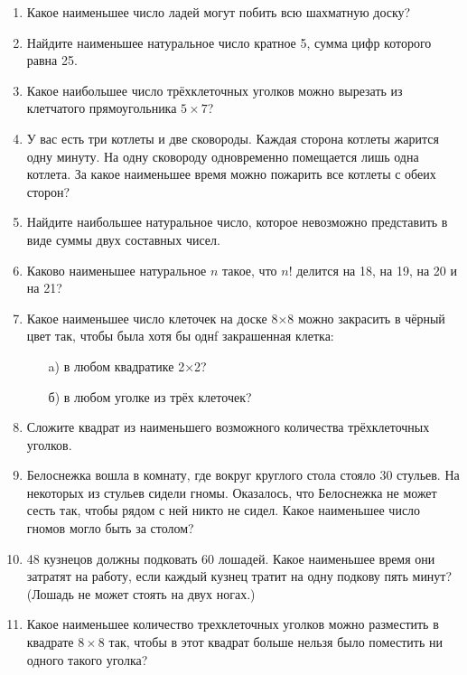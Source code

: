 \documentclass{article}
\begin{document}
	
	\begin{enumerate}[label*=\protect\fbox{\arabic{enumi}}]
		
		\item Какое наименьшее число ладей могут побить всю шахматную доску?
		
		\item Найдите наименьшее натуральное число кратное 5, сумма цифр которого равна 25.
		
		\item Какое наибольшее число трёхклеточных уголков можно вырезать из клетчатого прямоугольника $5 \times 7$?
		
		\item У вас есть три котлеты и две сковороды. Каждая сторона котлеты жарится одну минуту. На одну сковороду одновременно помещается лишь одна котлета. За какое наименьшее время можно пожарить все котлеты с обеих сторон?
		
		\item Найдите наибольшее натуральное число, которое невозможно представить в виде суммы двух составных чисел.
		
		\item Каково наименьшее натуральное $n$ такое, что $n!$ делится на 18, на 19, на 20 и на 21?
		
		\item Какое наименьшее число клеточек на доске 8×8 можно закрасить в чёрный цвет так, чтобы была хотя бы однf закрашенная клетка:
		\begin{enumerate} 
			\item[a)] в любом квадратике 2×2?
			\item[б)] в любом уголке из трёх клеточек?
		\end{enumerate}
		\item Сложите квадрат из наименьшего возможного количества трёхклеточных уголков. 
		
		\item Белоснежка вошла в комнату, где вокруг круглого стола стояло 30 стульев. На некоторых из стульев сидели гномы. Оказалось, что Белоснежка не может сесть так, чтобы рядом с ней никто не сидел. Какое наименьшее число гномов могло быть за столом?
		
		\item 48 кузнецов должны подковать 60 лошадей. Какое наименьшее время они затратят на работу, если каждый кузнец тратит на одну подкову пять минут? (Лошадь не может стоять на двух ногах.)
		
		\item Какое наименьшее количество трехклеточных уголков можно разместить в квадрате $8\times  8$ так, чтобы в этот квадрат больше нельзя было поместить ни одного такого уголка? 
		

\end{enumerate}
\end{document}
